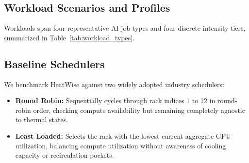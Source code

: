 \documentclass[conference,10pt]{IEEEtran}
\begin{document}
\subsection{Workload Scenarios and Profiles}
Workloads span four representative AI job types and four discrete intensity tiers, summarized in Table~\ref{tab:workload_types}.

\begin{table}[htbp]
\caption{Workload Characterization and Demand Profiles}
\label{tab:workload_types}
\centering
{}
\end{table}

\subsection{Baseline Schedulers}
We benchmark HeatWise against two widely adopted industry schedulers:
\begin{itemize}
    \item \textbf{Round Robin:} Sequentially cycles through rack indices 1 to 12 in round-robin order, checking compute availability but remaining completely agnostic to thermal states.
    \item \textbf{Least Loaded:} Selects the rack with the lowest current aggregate GPU utilization, balancing compute utilization without awareness of cooling capacity or recirculation pockets.
\end{itemize}
\end{document}
